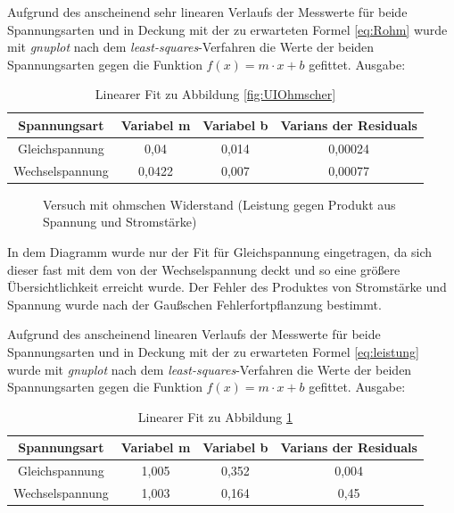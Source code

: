 Aufgrund des anscheinend sehr linearen Verlaufs der Messwerte für beide Spannungsarten und in Deckung mit der zu erwarteten Formel \ref{eq:Rohm} wurde mit \emph{gnuplot} nach dem \emph{least-squares}-Verfahren die Werte der beiden Spannungsarten gegen die Funktion $f(x)=m\cdot x+b$ gefittet. Ausgabe:
\begin{table}[H]
  \centering
  \begin{tabular}{c | c | c | c}
    Spannungsart & Variabel m & Variabel b & Varians der Residuals\\ \hline
    Gleichspannung & 0,04 & 0,014 & 0,00024\\
    Wechselspannung & 0,0422 & 0,007 & 0,00077
  \end{tabular}
  \caption{Linearer Fit zu Abbildung \ref{fig:UIOhmscher}}
  \label{tab:fitUIOhmscher}
\end{table}
\begin{figure}[H]
  \centering
  \caption{Versuch mit ohmschen Widerstand (Leistung gegen Produkt aus Spannung und Stromstärke)}
  \label{fig:PUIOhmscher}
\end{figure}
In dem Diagramm wurde nur der Fit für Gleichspannung eingetragen, da sich dieser fast mit dem von der Wechselspannung deckt und so eine größere Übersichtlichkeit erreicht wurde. Der Fehler des Produktes von Stromstärke und Spannung wurde nach der Gaußschen Fehlerfortpflanzung bestimmt.

Aufgrund des anscheinend linearen Verlaufs der Messwerte für beide Spannungsarten und in Deckung mit der zu erwarteten Formel \ref{eq:leistung} wurde mit \emph{gnuplot} nach dem \emph{least-squares}-Verfahren die Werte der beiden Spannungsarten gegen die Funktion $f(x)=m\cdot x+b$ gefittet. Ausgabe:
\begin{table}[H]
  \centering
  \begin{tabular}{c | c | c | c}
    Spannungsart & Variabel m & Variabel b & Varians der Residuals\\ \hline
    Gleichspannung & 1,005 & 0,352 & 0,004\\
    Wechselspannung & 1,003 & 0,164 & 0,45
  \end{tabular}
  \caption{Linearer Fit zu Abbildung \ref{fig:PUIOhmscher}}
  \label{tab:fitPUIOhmscher}
\end{table}
